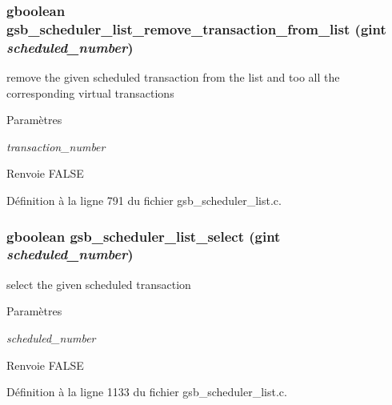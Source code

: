 \subsubsection[{gsb\_\-scheduler\_\-list\_\-remove\_\-transaction\_\-from\_\-list}]{\setlength{\rightskip}{0pt plus 5cm}gboolean gsb\_\-scheduler\_\-list\_\-remove\_\-transaction\_\-from\_\-list (gint {\em scheduled\_\-number})}\label{gsb__scheduler__list_8c_ae61448df24743985077437b1ef276cc5}
remove the given scheduled transaction from the list and too all the corresponding virtual transactions


\begin{DoxyParams}{Paramètres}
\item[{\em transaction\_\-number}]\end{DoxyParams}
\begin{DoxyReturn}{Renvoie}
FALSE 
\end{DoxyReturn}


Définition à la ligne 791 du fichier gsb\_\-scheduler\_\-list.c.

\subsubsection[{gsb\_\-scheduler\_\-list\_\-select}]{\setlength{\rightskip}{0pt plus 5cm}gboolean gsb\_\-scheduler\_\-list\_\-select (gint {\em scheduled\_\-number})}\label{gsb__scheduler__list_8c_acbc7a6e13ae89beb5afb56a3e8bba495}
select the given scheduled transaction


\begin{DoxyParams}{Paramètres}
\item[{\em scheduled\_\-number}]\end{DoxyParams}
\begin{DoxyReturn}{Renvoie}
FALSE 
\end{DoxyReturn}


Définition à la ligne 1133 du fichier gsb\_\-scheduler\_\-list.c.

